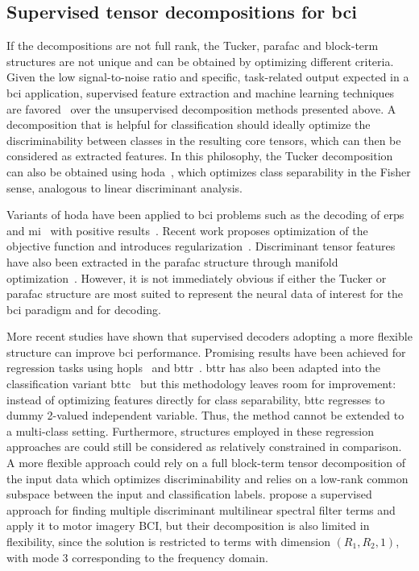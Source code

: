 \documentclass[twocolumn]{article}
\begin{document}
\subsection{Supervised tensor decompositions for \ac{bci}}

If the decompositions are not full rank, the Tucker, \ac{parafac} and block-term
structures are not unique and can be obtained by optimizing different criteria.
Given the low signal-to-noise ratio and specific, task-related output expected
in a \ac{bci} application, supervised feature extraction and machine learning techniques are
favored~\cite{Lotte2018} over the unsupervised decomposition methods presented
above.
A decomposition that is helpful for classification should ideally optimize
the discriminability between classes in the resulting core tensors, which can
then be considered as extracted features.
In this philosophy, the Tucker decomposition can also be obtained
using \ac{hoda}~\cite{Yan2005,Phan2010,Froelich2018}, which optimizes class
separability in the Fisher sense, analogous to linear discriminant analysis.

Variants of \ac{hoda} have been applied to \ac{bci} problems such as the decoding
of \acp{erp}~\cite{Onishi2012,Higashi2016} and \ac{mi}~\cite{Liu2015,Cai2021}
with positive results~\cite{Lotte2018}.
Recent work proposes optimization of the objective
function and introduces regularization~\cite{JamshidiIdaji2017,Jorajuria2022,Aghili2023}.
Discriminant tensor features have also been extracted
in the \ac{parafac} structure through manifold optimization~\cite{Froelich2018}.
However, it is not immediately obvious if either the Tucker or \ac{parafac}
structure are most suited to represent the neural data of interest for the
\ac{bci}
paradigm and for decoding.

More recent studies have shown that supervised decoders adopting a more flexible structure
can improve \ac{bci} performance.
Promising results have been achieved for regression tasks using
\ac{hopls}~\cite{Zhao2012,Camarrone2018} and \ac{bttr}~\cite{Faes2022,Faes2022a}.
\ac{bttr} has also been adapted into the classification variant \ac{bttc}~\cite{Camarrone2021}
but this methodology leaves room for improvement:
instead of optimizing features directly for class separability, \ac{bttc} regresses
to dummy 2-valued independent variable.
Thus, the method cannot be extended to a multi-class setting.
Furthermore, structures employed in these regression approaches are could still
be considered as relatively constrained in comparison.
A more flexible approach could rely on a full block-term tensor decomposition
of the input data which optimizes discriminability and relies on a low-rank
common subspace between the input and classification labels.
\textcite{Huang2020} propose a supervised approach for finding multiple discriminant
multilinear spectral filter terms and apply it to motor imagery BCI, but their
decomposition is also limited in flexibility, since the solution is
restricted to terms with  dimension $(R_1,R_2,1)$, with mode 3
corresponding to the frequency domain.
\end{document}
